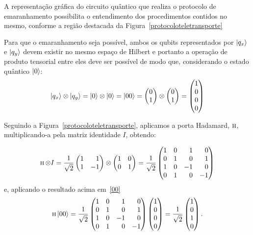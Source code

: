 A representação gráfica do circuito quântico que realiza o protocolo de emaranhamento possibilita o entendimento dos procedimentos contidos no mesmo, conforme a região destacada da Figura~\ref{protocoloteletransporte}

Para que o emaranhamento seja possível, ambos os qubits representados por $\ket{q_x}$ e $\ket{q_y}$ devem existir no mesmo espaço de Hilbert e portanto a operação de produto tensorial entre eles deve ser possível de modo que, considerando o estado quântico $\ket{0}$:
\begin{equation}
\ket{q_x} \otimes \ket{q_y} = \ket{0} \otimes \ket{0} = \ket{00} = \begin{pmatrix}
0 \\
1
\end{pmatrix} \otimes \begin{pmatrix}
0 \\
1
\end{pmatrix} = \begin{pmatrix}
1 \\
0 \\
0 \\
0
\end{pmatrix}
\end{equation}

Seguindo a Figura~\ref{protocoloteletransporte}, aplicamos a porta Hadamard, \(\operatorname{\textsc{h}}\), multiplicando-a pela matriz identidade \(I\), obtendo:

\begin{equation}
\HAD \otimes I = \frac{1}{\sqrt{2}} \begin{pmatrix*}[r]
1 & 1 \\
1 & -1
\end{pmatrix*} \otimes \begin{pmatrix}
1 & 0 \\
0 & 1
\end{pmatrix} = \frac{1}{\sqrt{2}} \begin{pmatrix*}[r]
1 & 0 & 1 & 0 \\
0 & 1 & 0 & 1 \\
1 & 0 & -1 & 0 \\
0 & 1 & 0 & -1
\end{pmatrix*}
\end{equation}
e, aplicando o resultado acima em~\eqref{00}
\begin{equation}
\HAD \ket{00} = \frac{1}{\sqrt{2}} \begin{pmatrix*}[r]
1 & 0 & 1 & 0 \\
0 & 1 & 0 & 1 \\
1 & 0 & -1 & 0 \\
0 & 1 & 0 & -1
\end{pmatrix*} \begin{pmatrix}
1 \\
0 \\
0 \\
0
\end{pmatrix} = \frac{1}{\sqrt{2}} \begin{pmatrix}
1 \\
0 \\
1 \\
0
\end{pmatrix}.
\end{equation}

